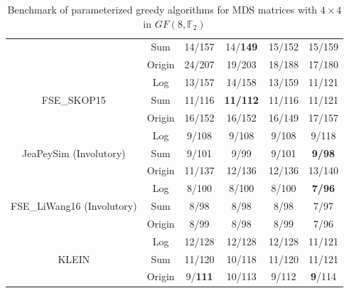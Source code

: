 \begin{table}[H]
{\begin{tabular}{ c c c c c c }
             & Sum & 14/157 & 14/{\color{red}\textbf{149}} & 15/152 & 15/159 \\
             & Origin & 24/207 & 19/203 & 18/188 & 17/180 \\
             \hline
             \multirow{3}{4em}{FSE\_SKOP15\cite{cryptoeprint:2015/258}} & Log &  13/157 & 14/158  & 13/159  & 11/121 \\
             & Sum & 11/116 & {\color{red}\textbf{11/112}} & 11/116 & 11/121  \\
             & Origin & 16/152 & 16/152 & 16/149 & 17/157  \\
             \hline
             \multirow{3}{4em}{JeaPeySim\cite{cryptoeprint:2017/101} (Involutory)} & Log &  9/108 & 9/108  & 9/108  & 9/118 \\
             & Sum & 9/101 & 9/99 & 9/101 & {\color{red}\textbf{9/98}}  \\
             & Origin & 11/137 & 12/136 & 12/136 & 13/140  \\
             \hline
             \multirow{3}{4em}{FSE\_LiWang16\cite{cryptoeprint:2016/406} (Involutory)} & Log &  8/100 & 8/100 & 8/100 & {\color{red}\textbf{7/96}} \\
             & Sum & 8/98 & 8/98 & 8/98 & 7/97 \\
             & Origin & 8/99 & 8/98 & 8/99 & 7/96 \\
             \hline
             \multirow{3}{4em}{KLEIN\cite{cryptoeprint:2026/1007}} & Log &  12/128 & 12/128  & 12/128  & 11/121 \\
             & Sum & 11/120 & 10/118 & 11/120 & 11/121  \\
             & Origin & 9/{\color{red}\textbf{111}} & 10/113 & 9/112 & {\color{red}\textbf{9}}/114  \\
             \hline
        \end{tabular}}
        \caption{Benchmark of parameterized greedy algorithms for MDS matrices with $4 \times 4$ in $GF(8, \mathbb{F}_{2})$}
        \label{tab:greedy-algorithm-against-mds-4x4-gf8}
        \end{table}

